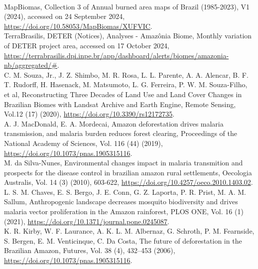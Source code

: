 \documentclass[a4paper,fleqn]{cas-dc}
\begin{document}
\begin{thebibliography}{00}
\\
 MapBiomas, Collection 3 of Annual burned area maps of Brazil (1985-2023), V1 (2024), accessed on 24 September 2024, \href{https://doi.org/10.58053/MapBiomas/XUFVIC}{https://doi.org/10.58053/MapBiomas/XUFVIC}.
\\
 TerraBrasilis, DETER (Notices), Analyses - Amazônia Biome, Monthly variation of DETER project area, accessed on 17 October 2024, \href{https://terrabrasilis.dpi.inpe.br/app/dashboard/alerts/biomes/amazonia-nb/aggregated/\#}{https://terrabrasilis.dpi.inpe.br/app/dashboard/alerts/biomes/amazonia-nb/aggregated/\#}.
\\
  C. M. Souza, Jr., J. Z. Shimbo,  M. R. Rosa,  L. L. Parente, A. A.  Alencar,  B. F. T. Rudorff, H. Hasenack, M. Matsumoto, L. G. Ferreira, P. W. M. Souza-Filho, et al, Reconstructing Three Decades of Land Use and Land Cover Changes in Brazilian Biomes with Landsat Archive and Earth Engine, Remote Sensing, Vol.12 (17) (2020), \href{https://doi.org/10.3390/rs12172735}{https://doi.org/10.3390/rs12172735}.
\\
 A. J. MacDonald, E. A. Mordecai, Amazon deforestation drives malaria transmission, and malaria burden reduces forest clearing, Proceedings of the National Academy of Sciences, Vol. 116 (44) (2019), \href{https://doi.org/10.1073/pnas.1905315116}{https://doi.org/10.1073/pnas.1905315116}.
\\
 M. da Silva-Nunes, Environmental changes impact in malaria transmition and prospects for the disease control in brazilian amazon rural settlements, Oecologia Australis, Vol. 14 (3) (2010), 603-622, \href{https://doi.org/10.4257/oeco.2010.1403.02}{https://doi.org/10.4257/oeco.2010.1403.02}.
\\
 L. S. M. Chaves, E. S. Bergo, J. E. Conn, G. Z. Laporta, P. R. Prist, M. A. M. Sallum, Anthropogenic landscape decreases mosquito biodiversity and drives malaria vector proliferation in the Amazon rainforest, PLOS ONE, Vol. 16 (1) (2021), \href{https://doi.org/10.1371/journal.pone.0245087}{https://doi.org/10.1371/journal.pone.0245087}.
\\
 K. R. Kirby, W. F. Laurance, A. K. L. M.  Albernaz, G. Schroth, P. M. Fearnside, S. Bergen, E. M. Venticinque, C. Da Costa, The future of deforestation in the Brazilian Amazon, Futures, Vol. 38 (4), 432–453 (2006), \href{https://doi.org/10.1073/pnas.1905315116}{https://doi.org/10.1073/pnas.1905315116}.

\end{thebibliography}
\end{document}
